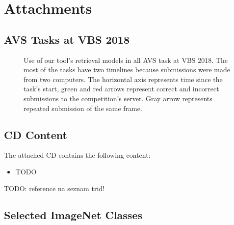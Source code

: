\chapter{Attachments}

\section{AVS Tasks at VBS 2018}\label{att:vbs_tasks_timeline_avs}

\begin{figure}[h]
	\centering
	
	
	\caption[Use of tool's retrieval models in AVS tasks]{Use of our tool's retrieval models in all AVS task at VBS 2018. The most of the tasks have two timelines because submissions were made from two computers. The horizontal axis represents time since the task's start, green and red arrows represent correct and incorrect submissions to the competition's server. Gray arrow represents repeated submission of the same frame.}
	\label{fig:vbs_tasks_timeline_avs}
\end{figure}

\section{CD Content}\label{att:cd}
The attached CD contains the following content:
\begin{itemize}
	\item TODO
\end{itemize}
TODO: reference na seznam trid!
\clearpage
\section{Selected ImageNet Classes}\label{att:classes}
\noindent\begin{multicols}{9}
{\scriptsize }
\end{multicols}